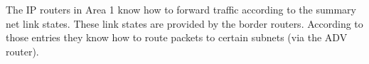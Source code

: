 The IP routers in Area 1 know how to forward traffic according to the summary net link states. These link states are provided by the border routers. According to those entries they know how to route packets to certain subnets (via the ADV router).
